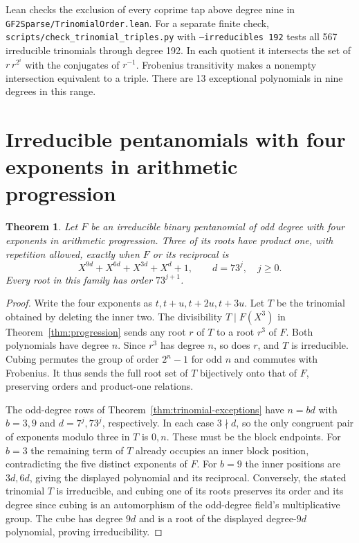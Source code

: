 \documentclass[11pt]{article}
\newtheorem{theorem}{Theorem}
\begin{document}
Lean checks the exclusion of every coprime tap above degree nine in
\nolinkurl{GF2Sparse/TrinomialOrder.lean}.
For a separate finite check, \nolinkurl{scripts/check_trinomial_triples.py}
with \texttt{--irreducibles 192} tests all 567 irreducible trinomials
through degree 192. In each quotient it intersects the set of
\(r\,r^{2^i}\) with the conjugates of \(r^{-1}\).
Frobenius transitivity makes a nonempty intersection equivalent to a triple.
There are 13 exceptional polynomials in nine degrees in this range.

\section{Irreducible pentanomials with four exponents in arithmetic progression}
\begin{theorem}\label{thm:progression-triples}
Let \(F\) be an irreducible binary pentanomial of odd degree with four
exponents in arithmetic progression. Three of its roots have product one,
with repetition allowed, exactly when \(F\) or its reciprocal is
\[
      X^{9d}+X^{6d}+X^{3d}+X^d+1,\qquad d=73^j,\quad j\ge0.
\]
Every root in this family has order \(73^{j+1}\).
\end{theorem}
\begin{proof}
Write the four exponents as \(t,t+u,t+2u,t+3u\). Let \(T\) be the
trinomial obtained by deleting the inner two. The divisibility
\(T\mid F(X^3)\) in Theorem~\ref{thm:progression} sends any root
\(r\) of \(T\) to a root \(r^3\) of \(F\). Both polynomials have degree \(n\).
Since \(r^3\) has degree \(n\), so does \(r\), and \(T\) is irreducible.
Cubing permutes the group of order \(2^n-1\) for odd \(n\) and
commutes with Frobenius. It thus sends the full root set of \(T\)
bijectively onto that of \(F\), preserving orders and product-one relations.

The odd-degree rows of Theorem~\ref{thm:trinomial-exceptions} have
\(n=bd\) with \(b=3,9\) and \(d=7^j,73^j\), respectively.
In each case \(3\nmid d\), so the only congruent pair of exponents
modulo three in \(T\) is \(0,n\). These must be the block endpoints.
For \(b=3\) the remaining term of \(T\) already occupies an inner block
position, contradicting the five distinct exponents of \(F\).
For \(b=9\) the inner positions are \(3d,6d\), giving the displayed
polynomial and its reciprocal. Conversely, the stated trinomial \(T\)
is irreducible, and cubing one of its roots preserves its order and
its degree since cubing is an automorphism of the odd-degree field's
multiplicative group. The cube has degree \(9d\) and is a root
of the displayed degree-\(9d\) polynomial, proving irreducibility.
\end{proof}
\end{document}
